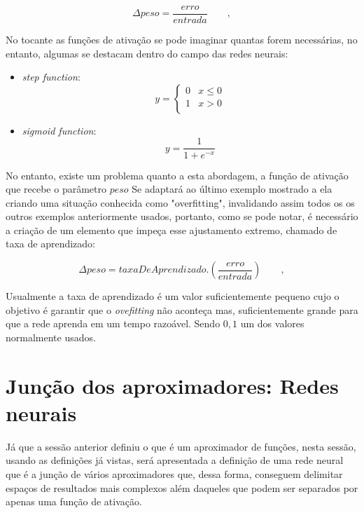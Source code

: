 \begin{apendicesenv}
		\begin{equation}
			\Delta peso = \dfrac{erro} { entrada} \qquad,
		\end{equation}
	
		\par No tocante as funções de ativação se pode imaginar quantas forem necessárias, no entanto, algumas se destacam dentro do campo das redes neurais:
	
		\begin{itemize}
			\item \textit{step function}: \begin{equation}
				y = \begin{cases} 
					0 & x\leq 0 \\
					1 & x > 0 \\
				\end{cases}
			\end{equation}
			\item \textit{sigmoid function}: \begin{equation}
				y = \dfrac{1}{1 + e^{-x}}
			\end{equation}
		\end{itemize}
	
		\par No entanto, existe um problema quanto a esta abordagem, a função de ativação que recebe o parâmetro $peso$ Se adaptará ao último exemplo mostrado a ela criando uma situação conhecida como "overfitting", invalidando assim todos os os outros exemplos anteriormente usados, portanto, como se pode notar, é necessário a criação de um elemento que impeça esse ajustamento extremo, chamado de taxa de aprendizado:
		
		\begin{equation}
			\Delta peso = taxaDeAprendizado . \left( \dfrac{erro} { entrada} \right) \qquad,
		\end{equation}
			
		\par Usualmente a taxa de aprendizado é um valor suficientemente pequeno cujo o objetivo é garantir que o \textit{ovefitting} não aconteça mas, suficientemente grande para que a rede aprenda em um tempo razoável. Sendo $0,1$ um dos valores normalmente usados.
	\section{Junção dos aproximadores: Redes neurais }
		\par Já que a sessão anterior definiu o que é um aproximador de funções, nesta sessão, usando as definições já vistas, será apresentada a definição de uma rede neural que é a junção de vários aproximadores que, dessa forma, conseguem  delimitar espaços de resultados mais complexos além daqueles que podem ser separados por apenas uma função de ativação.
		

\end{apendicesenv}
